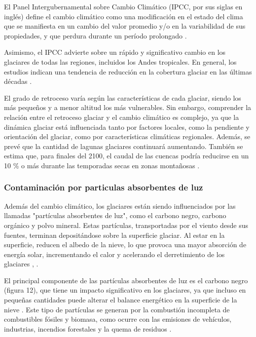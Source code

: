 	El Panel Intergubernamental sobre Cambio Climático (IPCC, por sus siglas en inglés) define el cambio climático como una modificación en el estado del clima que se manifiesta en un cambio del valor promedio y/o en la variabilidad de sus propiedades, y que perdura durante un período prolongado \parencite{ipcc2019}.
	
	Asimismo, el IPCC advierte sobre un rápido y significativo cambio en los glaciares de todas las regiones, incluidos los Andes tropicales. En general, los estudios indican una tendencia de reducción en la cobertura glaciar en las últimas décadas \parencite{inaigem2023}.
	
	El grado de retroceso varía según las características de cada glaciar, siendo los más pequeños y a menor altitud los más vulnerables. Sin embargo, comprender la relación entre el retroceso glaciar y el cambio climático es complejo, ya que la dinámica glaciar está influenciada tanto por factores locales, como la pendiente y orientación del glaciar, como por características climáticas regionales. Además, se prevé que la cantidad de lagunas glaciares continuará aumentando. También se estima que, para finales del 2100, el caudal de las cuencas podría reducirse en un 10 \% o más durante las temporadas secas en zonas montañosas \parencite{ipcc2019}.
	
	\subsubsection{Contaminación por particulas absorbentes de luz}
	Además del cambio climático, los glaciares están siendo influenciados por las llamadas "partículas absorbentes de luz", como el carbono negro, carbono orgánico y polvo mineral. Estas partículas, transportadas por el viento desde sus fuentes, terminan depositándose sobre la superficie glaciar. Al estar en la superficie, reducen el albedo de la nieve, lo que provoca una mayor absorción de energía solar, incrementando el calor y acelerando el derretimiento de los glaciares \parencite{bond2013}, \parencite{gilardoni2022}.
	
	El principal componente de las partículas absorbentes de luz es el carbono negro (figura 12), que tiene un impacto significativo en los glaciares, ya que incluso en pequeñas cantidades puede alterar el balance energético en la superficie de la nieve \parencite{inaigem2023}. Este tipo de partículas se generan por la combustión incompleta de combustibles fósiles y biomasa, como ocurre con las emisiones de vehículos, industrias, incendios forestales y la quema de residuos \parencite{bond2013}.
	
